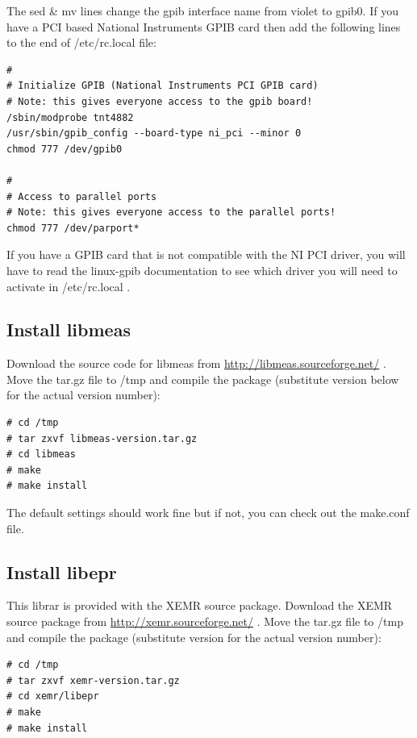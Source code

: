 \documentclass[byrevtex,amssymb,aps,pra,floatfix,letterpaper]{revtex4}
\begin{document}
\noindent
The sed \& mv lines change the gpib interface name from violet to gpib0. If you have a PCI based National Instruments GPIB card then add the following lines to the end of /etc/rc.local file:

\begin{verbatim}
#
# Initialize GPIB (National Instruments PCI GPIB card)
# Note: this gives everyone access to the gpib board!
/sbin/modprobe tnt4882
/usr/sbin/gpib_config --board-type ni_pci --minor 0
chmod 777 /dev/gpib0

#
# Access to parallel ports
# Note: this gives everyone access to the parallel ports!
chmod 777 /dev/parport*

\end{verbatim}

\noindent
If you have a GPIB card that is not compatible with the NI PCI driver, you will have to read the linux-gpib documentation to see which driver you will need to activate in /etc/rc.local .

\subsection{Install libmeas}

Download the source code for libmeas from \url{http://libmeas.sourceforge.net/} . Move the tar.gz file to /tmp and compile the package (substitute version below for the actual version number):

\begin{verbatim}
# cd /tmp
# tar zxvf libmeas-version.tar.gz
# cd libmeas
# make
# make install
\end{verbatim}

\noindent
The default settings should work fine but if not, you can check out the make.conf file.

\subsection{Install libepr}

This librar is provided with the XEMR source package. Download the XEMR source package from \url{http://xemr.sourceforge.net/} . Move the tar.gz file to /tmp and compile the package (substitute version for the actual version number):

\begin{verbatim}
# cd /tmp
# tar zxvf xemr-version.tar.gz
# cd xemr/libepr
# make
# make install
\end{verbatim}
\end{document}
